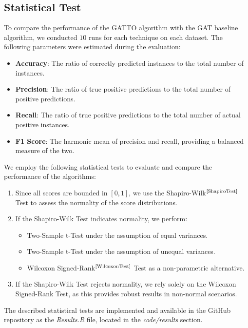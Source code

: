 \documentclass[12pt,conference]{ieeeconf} %
\begin{document}
\subsection{Statistical Test}
To compare the performance of the GATTO algorithm with the GAT baseline algorithm, we conducted $10$ runs for each technique on each dataset. The following parameters were estimated during the evaluation:
\begin{itemize} 
    \item \textbf{Accuracy}: The ratio of correctly predicted instances to the total number of instances. 
    \item \textbf{Precision}: The ratio of true positive predictions to the total number of positive predictions. 
    \item \textbf{Recall}: The ratio of true positive predictions to the total number of actual positive instances. 
    \item \textbf{F1 Score}: The harmonic mean of precision and recall, providing a balanced measure of the two. 
\end{itemize}
We employ the following statistical tests to evaluate and compare the performance of the algorithms:
\begin{enumerate} 
    \item Since all scores are bounded in $[0,1]$, we use the Shapiro-Wilk$^{\text{\cite{ShapiroTest}}}$ Test to assess the normality of the score distributions. 
    \item If the Shapiro-Wilk Test indicates normality, we perform: 
        \begin{itemize} 
            \item Two-Sample t-Test under the assumption of equal variances. 
            \item Two-Sample t-Test under the assumption of unequal variances. 
            \item Wilcoxon Signed-Rank$^{\text{\cite{WilcoxonTest}}}$ Test as a non-parametric alternative. 
        \end{itemize} 
        \item If the Shapiro-Wilk Test rejects normality, we rely solely on the Wilcoxon Signed-Rank Test, as this provides robust results in non-normal scenarios. 
\end{enumerate}
The described statistical tests are implemented and available in the GitHub repository as the \textit{Results.R} file, located in the \textit{code/results} section.

\end{document}
